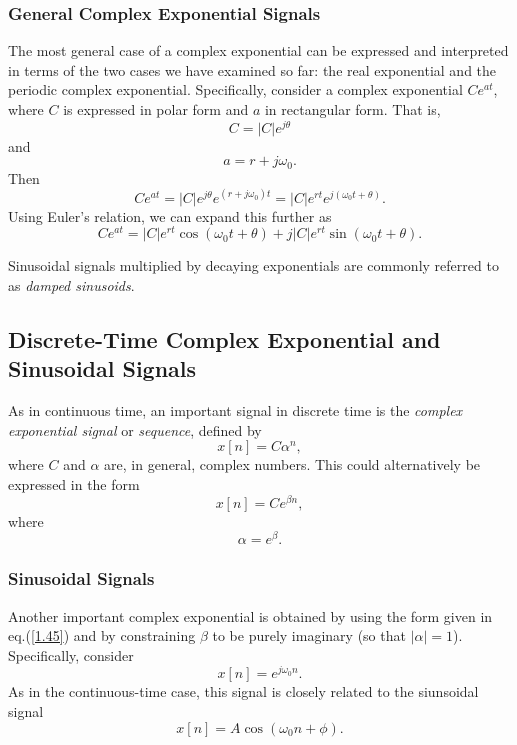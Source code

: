 \documentclass[a4paper,twoside]{book}
\begin{document}
\subsubsection{General Complex Exponential Signals}

The most general case of a complex exponential can be expressed and interpreted in terms of the two cases we have examined so far: the real exponential and the periodic complex exponential. Specifically, consider a complex exponential $Ce^{at}$, where $C$ is expressed in polar form and $a$ in rectangular form. That is, $$C=|C|e^{j\theta}$$ and $$a=r+j\omega_0.$$ Then
\begin{equation}
    Ce^{at} = |C|e^{j\theta}e^{(r+j\omega_{0})t} = |C|e^{rt}e^{j(\omega_{0}t+\theta)}.
    \label{1.42}
\end{equation}
Using Euler's relation, we can expand this further as
\begin{equation}
    Ce^{at} = \big|C\big|e^{rt}\cos(\omega_{0}t+\theta)+ j\big|C\big|e^{rt}\sin(\omega_{0}t+\theta).
    \label{1.43}
\end{equation}

Sinusoidal signals multiplied by decaying exponentials are commonly referred to as \textit{damped sinusoids}.

\subsection{Discrete-Time Complex Exponential and Sinusoidal Signals}

As in continuous time, an important signal in discrete time is the \textit{complex exponential signal} or \textit{sequence}, defined by
\begin{equation}
    x[n]=C\alpha^n,
    \label{1.44}
\end{equation}
where $C$ and $\alpha$ are, in general, complex numbers. This could alternatively be expressed in the form
\begin{equation}
    x[n]=Ce^{\beta n},
    \label{1.45}
\end{equation}
where $$\alpha=e^{\beta}.$$

\subsubsection{Sinusoidal Signals}

Another important complex exponential is obtained by using the form given in eq.\;(\ref{1.45}) and by constraining $\beta$ to be purely imaginary (so that $|\alpha|=1$). Specifically, consider
\begin{equation}
    x[n]=e^{j\omega_0 n}.
    \label{1.46}
\end{equation}
As in the continuous-time case, this signal is closely related to the siunsoidal signal
\begin{equation}
    x[n]=A\cos(\omega_0n+\phi).
    \label{1.47}
\end{equation}
\end{document}

